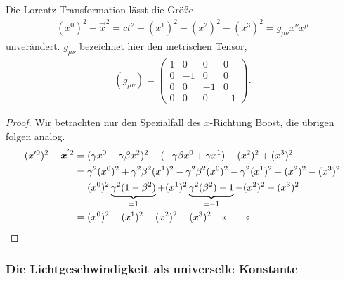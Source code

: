 \begin{bemn}
Die Lorentz-Transformation lässt die Größe
\begin{align*}
(x^0)^2 - \vec{x}^2 = ct^2-(x^1)^2-(x^2)^2-(x^3)^2 = g_{\mu\nu}x^\nu x^\mu
\end{align*} 
unverändert. $g_{\mu\nu}$ bezeichnet hier den metrischen Tensor,
\begin{align*}
(g_{\mu\nu}) =
\begin{pmatrix}
1 & 0& 0 & 0\\
0 & -1 & 0 & 0\\
0 & 0 & -1 & 0\\
0 & 0 & 0 & -1
\end{pmatrix}.
\end{align*}
\begin{proof}
Wir betrachten nur den Spezialfall des $x$-Richtung Boost, die übrigen folgen
analog.
\begin{align*}
(x'^0)^2 - \bm{x}^{'2} &=
(\gamma x^0 - \gamma\beta x^2)^2 - (-\gamma\beta x^0 + \gamma x^1) - (x^2)^2 +
(x^3)^2 \\
&= \gamma^2(x^0)^2 + \gamma^2\beta^2(x^1)^2 - \gamma^2\beta^2(x^0)^2 -
\gamma^2(x^1)^2 - (x^2)^2 - (x^3)^2\\
&= (x^0)^2\underbrace{\gamma^2(1-\beta^2)}_{=1} +
(x^1)^2\underbrace{\gamma^2(\beta^2)-1}_{=-1} - (x^2)^2 - (x^3)^2\\
&= (x^0)^2 - (x^1)^2 - (x^2)^2 - (x^3)^2\quad\text{<<}\quad\multimap
\end{align*}
\end{proof}
\end{bemn}

\subsubsection{Die Lichtgeschwindigkeit als universelle Konstante}

